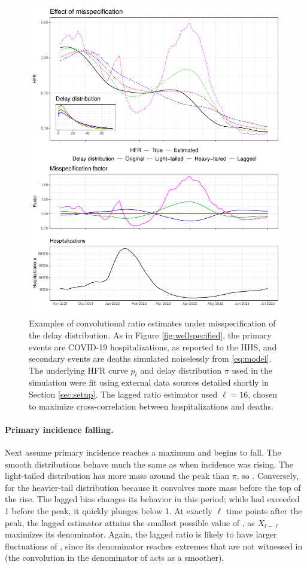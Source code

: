 \documentclass{article}
\begin{document}
\begin{figure}[p]
\centering
\includegraphics[width=0.9\linewidth]{Figures/Simulated/toy_misp.pdf}
\caption{Examples of convolutional ratio estimates under misspecification of the
  delay distribution.
  As in Figure \ref{fig:wellspecified}, the primary events are COVID-19
  hospitalizations, as reported to the HHS, and secondary events are deaths 
  simulated noiselessly from \eqref{eq:model}. The underlying HFR curve $p_t$
  and delay distribution $\pi$ used in the simulation were fit using external
  data sources detailed shortly in Section \ref{sec:setup}. The lagged ratio
  estimator used $\ell=16$, chosen to maximize cross-correlation between
  hospitalizations and deaths.} 
\label{fig:misspecified}
\end{figure}

\paragraph{Primary incidence falling.}

Next assume primary incidence reaches a maximum and begins to fall. The smooth
distributions behave much the same as when incidence was rising. The light-tailed
distribution has more mass around the peak than $\pi$, so . Conversely,  for the heavier-tail distribution
because it convolves more mass before the top of the rise. The lagged bias
changes its behavior in this period; while  had exceeded 1
before the peak, it quickly plunges below 1. At exactly $\ell$ time points after  
the peak, the lagged estimator attains the smallest possible value of
, as $X_{t-\ell}$ maximizes its denominator. Again, the
lagged ratio is likely to have larger fluctuations of ,
since its denominator reaches extremes that are not witnessed in
 (the convolution in the denominator of 
 acts as a smoother).   
\end{document}

